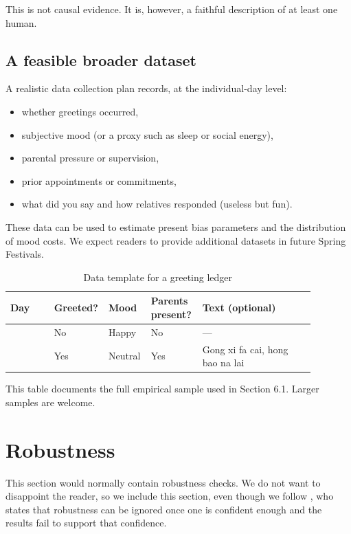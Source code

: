 \documentclass[AER]{AEA}
\begin{document}
This is not causal evidence. It is, however, a faithful description of at least one human.

\subsection{A feasible broader dataset}
A realistic data collection plan records, at the individual-day level:
\begin{itemize}
\item whether greetings occurred,
\item subjective mood (or a proxy such as sleep or social energy),
\item parental pressure or supervision,
\item prior appointments or commitments,
\item what did you say and how relatives responded (useless but fun).
\end{itemize}
These data can be used to estimate present bias parameters and the distribution of mood costs. We expect readers to provide additional datasets in future Spring Festivals.

\begin{table}[htbp]
\centering
\caption{Data template for a greeting ledger}
\begin{tabular}{>{\raggedright\arraybackslash}p{0.14\linewidth}
                >{\centering\arraybackslash}p{0.10\linewidth}
                >{\centering\arraybackslash}p{0.12\linewidth}
                >{\centering\arraybackslash}p{0.16\linewidth}
                >{\raggedright\arraybackslash}p{0.36\linewidth}}
\toprule
Day & Greeted? & Mood & Parents present? & Text (optional) \\
\midrule
1 & No  & Happy   & No  & --- \\
2 & Yes & Neutral & Yes & Gong xi fa cai, hong bao na lai \\
\bottomrule
\end{tabular}
\begin{tablenotes}
This table documents the full empirical sample used in Section 6.1. Larger samples are welcome.
\end{tablenotes}
\end{table}

\section{Robustness}
This section would normally contain robustness checks. We do not want to disappoint the reader, so we include this section, even though we follow \citet{wo2025}, who states that robustness can be ignored once one is confident enough and the results fail to support that confidence.
\end{document}
